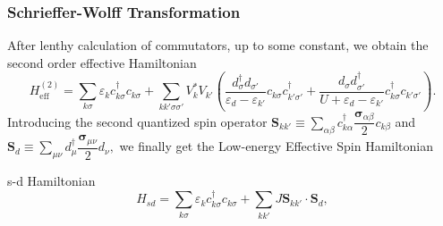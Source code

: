 \documentclass[10pt,aspectratio=43,xcolor=x11names,t]{beamer}%
\begin{document}
		\begin{frame}\frametitle{Schrieffer-Wolff Transformation}
			 After lenthy calculation of commutators, up to some constant, we obtain the second order effective Hamiltonian
			 \begin{equation*}
			 	H_{\text{eff}}^{(2)}=\sum_{k \sigma}\varepsilon_k c_{k \sigma}^\dagger c_{k \sigma}+\sum_{kk' \sigma\sigma'}V_k^*V_{k'}\left(\dfrac{d_\sigma^\dagger d_{\sigma'}}{\varepsilon_d- \varepsilon_{k'}}c_{k \sigma}c_{k'\sigma'}^\dagger+\dfrac{d_\sigma d_{\sigma'}^\dagger}{U+\varepsilon_d- \varepsilon_{k'}}c_{k \sigma}^\dagger c_{k'\sigma'}\right).
			 \end{equation*}
			 Introducing the second quantized spin operator $\bm{S}_{kk'}\equiv\sum_{\alpha \beta}c_{k \alpha}^\dagger\dfrac{\bm{\sigma}_{\alpha \beta}}{2}c_{k \beta}$ and $\bm{S}_d\equiv\sum_{\mu\nu}d_\mu^\dagger\dfrac{\bm{\sigma}_{\mu\nu}}{2}d_{\nu},$ we finally get the Low-energy Effective Spin Hamiltonian
			 \begin{greenblock}{s-d Hamiltonian}
			 	\begin{equation*}
			 		H_{sd}=\sum_{k \sigma}\varepsilon_k c_{k \sigma}^\dagger c_{k \sigma}+\sum_{kk'}J\bm{S}_{kk'}\cdot\bm{S}_d,
			 	\end{equation*}
			 \end{greenblock}
		\end{frame}
\end{document}
